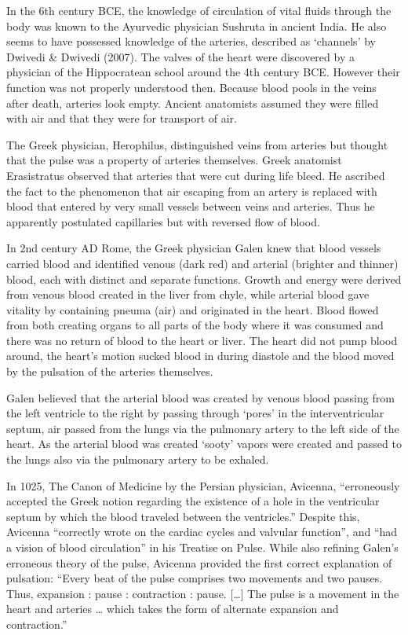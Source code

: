 In the 6th century BCE, the knowledge of circulation of vital fluids through the body was known to the Ayurvedic physician Sushruta in ancient India. He also seems to have possessed knowledge of the arteries, described as `channels' by Dwivedi \& Dwivedi (2007). The valves of the heart were discovered by a physician of the Hippocratean school around the 4th century BCE. However their function was not properly understood then. Because blood pools in the veins after death, arteries look empty. Ancient anatomists assumed they were filled with air and that they were for transport of air.

The Greek physician, Herophilus, distinguished veins from arteries but thought that the pulse was a property of arteries themselves. Greek anatomist Erasistratus observed that arteries that were cut during life bleed. He ascribed the fact to the phenomenon that air escaping from an artery is replaced with blood that entered by very small vessels between veins and arteries. Thus he apparently postulated capillaries but with reversed flow of blood.

In 2nd century AD Rome, the Greek physician Galen knew that blood vessels carried blood and identified venous (dark red) and arterial (brighter and thinner) blood, each with distinct and separate functions. Growth and energy were derived from venous blood created in the liver from chyle, while arterial blood gave vitality by containing pneuma (air) and originated in the heart. Blood flowed from both creating organs to all parts of the body where it was consumed and there was no return of blood to the heart or liver. The heart did not pump blood around, the heart's motion sucked blood in during diastole and the blood moved by the pulsation of the arteries themselves.

Galen believed that the arterial blood was created by venous blood passing from the left ventricle to the right by passing through `pores' in the interventricular septum, air passed from the lungs via the pulmonary artery to the left side of the heart. As the arterial blood was created `sooty' vapors were created and passed to the lungs also via the pulmonary artery to be exhaled.

In 1025, The Canon of Medicine by the Persian physician, Avicenna, ``erroneously accepted the Greek notion regarding the existence of a hole in the ventricular septum by which the blood traveled between the ventricles.'' Despite this, Avicenna ``correctly wrote on the cardiac cycles and valvular function'', and ``had a vision of blood circulation'' in his Treatise on Pulse. While also refining Galen's erroneous theory of the pulse, Avicenna provided the first correct explanation of pulsation: ``Every beat of the pulse comprises two movements and two pauses. Thus, expansion : pause : contraction : pause. {[}\ldots{]} The pulse is a movement in the heart and arteries \ldots{} which takes the form of alternate expansion and contraction.''

